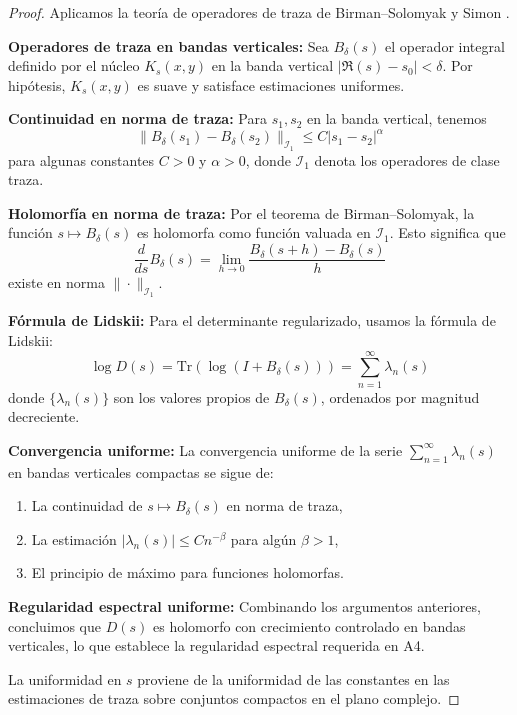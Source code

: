 \begin{proof}
Aplicamos la teoría de operadores de traza de Birman–Solomyak \cite{birman2003} y Simon \cite{simon2005}.

\textbf{Operadores de traza en bandas verticales:} Sea $B_\delta(s)$ el operador integral definido por el núcleo $K_s(x,y)$ en la banda vertical $|\Re(s) - s_0| < \delta$. Por hipótesis, $K_s(x,y)$ es suave y satisface estimaciones uniformes.

\textbf{Continuidad en norma de traza:} Para $s_1, s_2$ en la banda vertical, tenemos
\[
\|B_\delta(s_1) - B_\delta(s_2)\|_{\mathcal{I}_1} \leq C|s_1 - s_2|^\alpha
\]
para algunas constantes $C > 0$ y $\alpha > 0$, donde $\mathcal{I}_1$ denota los operadores de clase traza.

\textbf{Holomorfía en norma de traza:} Por el teorema de Birman–Solomyak, la función $s \mapsto B_\delta(s)$ es holomorfa como función valuada en $\mathcal{I}_1$. Esto significa que
\[
\frac{d}{ds} B_\delta(s) = \lim_{h \to 0} \frac{B_\delta(s+h) - B_\delta(s)}{h}
\]
existe en norma $\|\cdot\|_{\mathcal{I}_1}$.

\textbf{Fórmula de Lidskii:} Para el determinante regularizado, usamos la fórmula de Lidskii:
\[
\log D(s) = \text{Tr}(\log(I + B_\delta(s))) = \sum_{n=1}^\infty \lambda_n(s)
\]
donde $\{\lambda_n(s)\}$ son los valores propios de $B_\delta(s)$, ordenados por magnitud decreciente.

\textbf{Convergencia uniforme:} La convergencia uniforme de la serie $\sum_{n=1}^\infty \lambda_n(s)$ en bandas verticales compactas se sigue de:
\begin{enumerate}
\item La continuidad de $s \mapsto B_\delta(s)$ en norma de traza,
\item La estimación $|\lambda_n(s)| \leq C n^{-\beta}$ para algún $\beta > 1$,
\item El principio de máximo para funciones holomorfas.
\end{enumerate}

\textbf{Regularidad espectral uniforme:} Combinando los argumentos anteriores, concluimos que $D(s)$ es holomorfo con crecimiento controlado en bandas verticales, lo que establece la regularidad espectral requerida en A4.

La uniformidad en $s$ proviene de la uniformidad de las constantes en las estimaciones de traza sobre conjuntos compactos en el plano complejo.
\end{proof}
